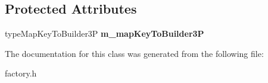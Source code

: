 \subsection*{Protected Attributes}
\begin{DoxyCompactItemize}
\item 
\hypertarget{class_t_obj_factory3_p_ad319167752612255d057559cef56463d}{type\+Map\+Key\+To\+Builder3\+P {\bfseries m\+\_\+map\+Key\+To\+Builder3\+P}}\label{class_t_obj_factory3_p_ad319167752612255d057559cef56463d}

\end{DoxyCompactItemize}


The documentation for this class was generated from the following file\+:\begin{DoxyCompactItemize}
\item 
factory.\+h\end{DoxyCompactItemize}
